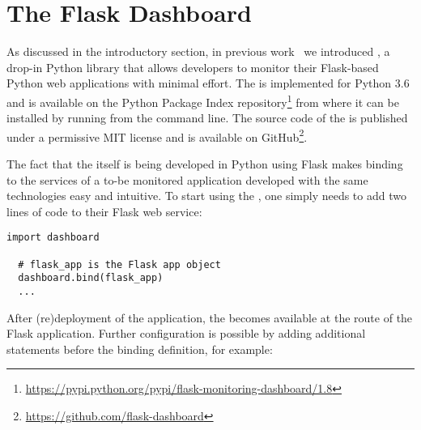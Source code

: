 \documentclass{sig-alternate-05-2015}
\begin{document}



\section{The Flask Dashboard}
\label{sec:tool}


  As discussed in the introductory section, in previous work~\cite{vogel2017low} we introduced \tool, a drop-in Python library that allows developers to monitor their Flask-based Python web applications with minimal effort.
%
  The \tool is implemented for Python 3.6 and is available on the Python Package Index repository\footnote{\url{https://pypi.python.org/pypi/flask-monitoring-dashboard/1.8}} from where it can be installed by running \install from the command line. 
%  
  The source code of the \tool is published under a permissive MIT license and is available on GitHub\footnote{\url{https://github.com/flask-dashboard}}.
  
  The fact that the \tool itself is being developed in Python using Flask makes binding to the services of a to-be monitored application developed with the same technologies easy and intuitive. 
  To start using the \tool, one simply needs to add two lines of code to their Flask web service:

  \begin{lstlisting}[style=custompython]
  import dashboard

  # flask_app is the Flask app object
  dashboard.bind(flask_app)
  ...
  \end{lstlisting}

  After (re)deployment of the application, the \tool becomes available at the  route of the Flask application. Further configuration is possible by adding additional statements before the binding definition, for example:
\end{document}
